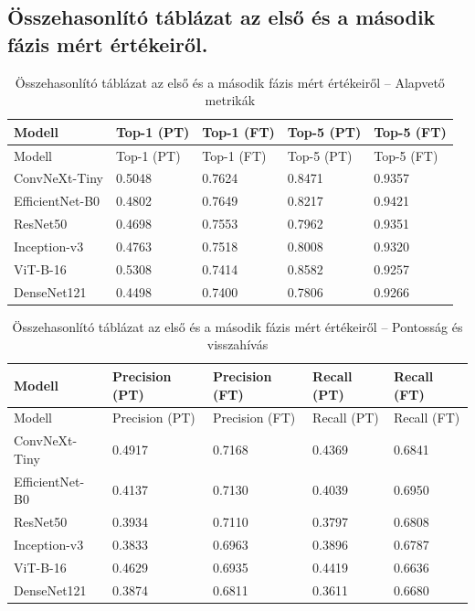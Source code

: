 \subsection{Összehasonlító táblázat az első és a második fázis mért értékeiről.}
    \begin{center}
        \begin{longtable}{lllll}
        \caption{Összehasonlító táblázat az első és a második fázis mért értékeiről – Alapvető metrikák}\label{tab:phase2_summary_table_02_basic}\\
        \toprule
        Modell & Top-1 (PT) & Top-1 (FT) & Top-5 (PT) & Top-5 (FT) \\
        \midrule
        \endfirsthead
        \toprule
        Modell & Top-1 (PT) & Top-1 (FT) & Top-5 (PT) & Top-5 (FT) \\
        \midrule
        \endhead
        ConvNeXt-Tiny & 0.5048 & 0.7624 & 0.8471 & 0.9357 \\
        EfficientNet-B0 & 0.4802 & 0.7649 & 0.8217 & 0.9421 \\
        ResNet50 & 0.4698 & 0.7553 & 0.7962 & 0.9351 \\
        Inception-v3 & 0.4763 & 0.7518 & 0.8008 & 0.9320 \\
        ViT-B-16 & 0.5308 & 0.7414 & 0.8582 & 0.9257 \\
        DenseNet121 & 0.4498 & 0.7400 & 0.7806 & 0.9266 \\
        \bottomrule
        \end{longtable}
    \end{center}
    

    \begin{center}
        \begin{longtable}{lllll}
        \caption{Összehasonlító táblázat az első és a második fázis mért értékeiről – Pontosság és visszahívás}\label{tab:phase2_summary_table_02_precision_recall}\\
        \toprule
        Modell & Precision (PT) & Precision (FT) & Recall (PT) & Recall (FT) \\
        \midrule
        \endfirsthead
        \toprule
        Modell & Precision (PT) & Precision (FT) & Recall (PT) & Recall (FT) \\
        \midrule
        \endhead
        ConvNeXt-Tiny & 0.4917 & 0.7168 & 0.4369 & 0.6841 \\
        EfficientNet-B0 & 0.4137 & 0.7130 & 0.4039 & 0.6950 \\
        ResNet50 & 0.3934 & 0.7110 & 0.3797 & 0.6808 \\
        Inception-v3 & 0.3833 & 0.6963 & 0.3896 & 0.6787 \\
        ViT-B-16 & 0.4629 & 0.6935 & 0.4419 & 0.6636 \\
        DenseNet121 & 0.3874 & 0.6811 & 0.3611 & 0.6680 \\
        \bottomrule
        \end{longtable}
    \end{center}
        

